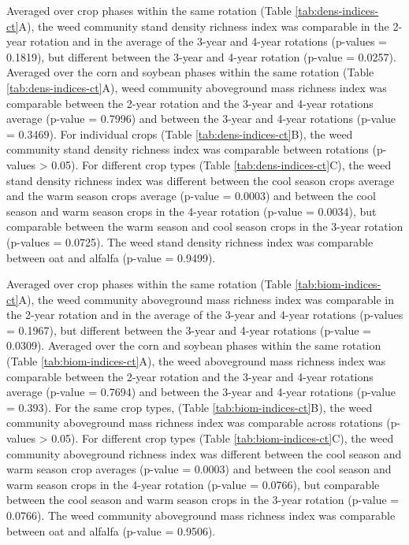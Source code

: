 \documentclass[
]{article}
\begin{document}
Averaged over crop phases within the same rotation (Table \ref{tab:dens-indices-ct}A), the weed community stand density richness index was comparable in the 2-year rotation and in the average of the 3-year and 4-year rotations (p-values = 0.1819), but different between the 3-year and 4-year rotation (p-value = 0.0257). Averaged over the corn and soybean phases within the same rotation (Table \ref{tab:dens-indices-ct}A), weed community aboveground mass richness index was comparable between the 2-year rotation and the 3-year and 4-year rotations average (p-value = 0.7996) and between the 3-year and 4-year rotations (p-value = 0.3469). For individual crops (Table \ref{tab:dens-indices-ct}B), the weed community stand density richness index was comparable between rotations (p-values \textgreater{} 0.05). For different crop types (Table \ref{tab:dens-indices-ct}C), the weed stand density richness index was different between the cool season crops average and the warm season crops average (p-value = 0.0003) and between the cool season and warm season crops in the 4-year rotation (p-value = 0.0034), but comparable between the warm season and cool season crops in the 3-year rotation (p-values = 0.0725). The weed stand density richness index was comparable between oat and alfalfa (p-value = 0.9499).

Averaged over crop phases within the same rotation (Table \ref{tab:biom-indices-ct}A), the weed community aboveground mass richness index was comparable in the 2-year rotation and in the average of the 3-year and 4-year rotations (p-values = 0.1967), but different between the 3-year and 4-year rotations (p-value = 0.0309). Averaged over the corn and soybean phases within the same rotation (Table \ref{tab:biom-indices-ct}A), the weed aboveground mass richness index was comparable between the 2-year rotation and the 3-year and 4-year rotations average (p-value = 0.7694) and between the 3-year and 4-year rotations (p-value = 0.393). For the same crop types, (Table \ref{tab:biom-indices-ct}B), the weed community aboveground mass richness index was comparable across rotations (p-values \textgreater{} 0.05). For different crop types (Table \ref{tab:biom-indices-ct}C), the weed community aboveground richness index was different between the cool season and warm season crop averages (p-value = 0.0003) and between the cool season and warm season crops in the 4-year rotation (p-value = 0.0766), but comparable between the cool season and warm season crops in the 3-year rotation (p-value = 0.0766). The weed community aboveground mass richness index was comparable between oat and alfalfa (p-value = 0.9506).
\end{document}
